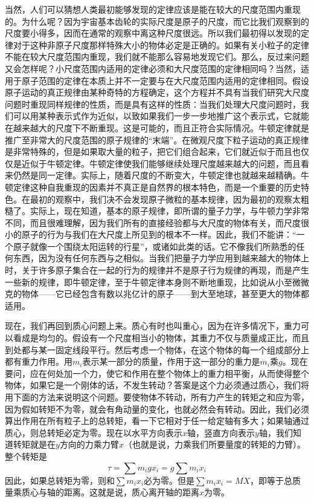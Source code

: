 当然，人们可以猜想人类最初能够发现的定律应该是能在较大的尺度范围内重现的。为什么呢？因为宇宙基本齿轮的实际尺度是原子的尺度，而它比我们观察到的尺度要小得多，因而在通常的观察中离这种尺度很远。所以我们最初得以发现的定律对于这种非原子尺度那样特殊大小的物体必定是正确的。如果有关小粒子的定律不能在较大尺度范围内重现，我们就不能那么容易地发现它们。那么，反过来问题又会怎样呢？小尺度范围内适用的定律必须和大尺度范围的定律相同吗？当然，适用于原子范围的定律在本质上并不一定要与在大尺度范围内适用的定律相同。假设原子运动的真正规律由某种奇特的方程确定，这个方程并不具有当我们研究大尺度问题时重现同样规律的性质，而是具有这样的性质：当我们处理大尺度问题时，我们可以用某种表示式作为近似，以致如果我们一步一步地推广这个表示式，它就能在越来越大的尺度下不断重现。这是可能的，而且正符合实际情况。牛顿定律就是推广至非常大的尺度范围的原子规律的“末端”。在微观尺度下粒子运动的真正规律是非常特殊的，但是如果取大量的粒子，把它们组合起来，它们就近似于而且也仅仅是近似于牛顿定律。牛顿定律使我们能够继续处理尺度越来越大的问题，而且看来仍然是同一定律。实际上，随着尺度的不断变大，牛顿定律也就越来越精确。牛顿定律这种自我重现的因素并不真正是自然界的根本特色，而是一个重要的历史特色。在最初的观察中，我们决不会发现原子微粒的基本规律，因为最初的观察太粗糙了。实际上，现在知道，基本的原子规律，即所谓的量子力学，与牛顿力学非常不同，而且很难理解，因为我们所有的直接经验都与大尺度的物体有关，而尺度很小的原子的行为与我们在大尺度上所见到的根本不一样。因此，我们不能讲：“一个原子就像一个围绕太阳运转的行星”，或诸如此类的话。它不像我们所熟悉的任何东西，因为没有任何东西与之相似。当我们把量子力学应用到越来越大的物体上时，关于许多原子集合在一起的行为的规律并不是原子行为规律的再现，而是产生一些新的规律，即牛顿定律，至于牛顿定律本身则不断地重现，比如说从小至微微克的物体——它已经包含有数以兆亿计的原子——到大至地球，甚至更大的物体都适用。

现在，我们再回到质心问题上来。质心有时也叫重心，因为在许多情况下，重力可以看成是均匀的。假设有一个尺度相当小的物体，其重力不仅与质量成正比，而且到处都与某一固定线段平行。然后考虑一个物体，在这个物体的每一个组成部分上都有重力作用。用$m_i$表示某一部分的质量，作用于这一部分的重力是$m_i$乘$g$。现在要问，应在何处加一个力，使它和作用在整个物体上的重力相平衡，从而使得整个物体，如果它是一个刚体的话，不发生转动？答案是这个力必须通过质心，我们将用下面的方法来说明这个问题。要使物体不转动，所有力产生的转矩之和应为零，因为假如转矩不为零，就会有角动量的变化，也就必然会有转动。因此，我们必须算出作用在所有粒子上的总转矩，看一下它相对于任一给定轴有多大；如果轴通过质心，则总转矩必定为零。现在以水平方向表示$x$轴，竖直方向表示$y$轴，我们知道转矩就是在$y$方向的力乘力臂$x$（也就是说，力乘我们所要量度的转矩的力臂）。整个转矩是
\begin{equation}
    \label{Eq:I:19:3}
    \tau = \sum m_igx_i = g\sum m_ix_i
\end{equation}
因此，如果总转矩为零，则和$\sum m_ix_i$必为零。但是$\sum m_ix_i=MX$，即等于总质量乘质心与轴的距离。这就是说，质心离开轴的距离$x$为零。

